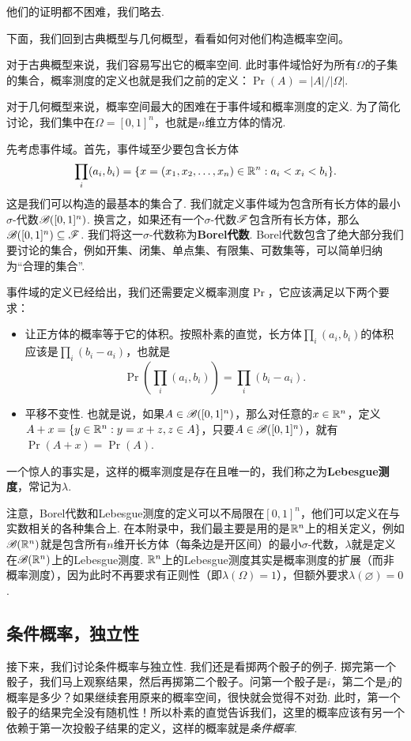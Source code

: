 他们的证明都不困难，我们略去. 

下面，我们回到古典概型与几何概型，看看如何对他们构造概率空间。 

对于古典概型来说，我们容易写出它的概率空间. 此时事件域恰好为所有$\Omega$的子集的集合，概率测度的定义也就是我们之前的定义：$\Pr(A)=|A|/|\Omega|$. 

对于几何概型来说，概率空间最大的困难在于事件域和概率测度的定义. 为了简化讨论，我们集中在$\Omega=[0,1]^n$，也就是$n$维立方体的情况. 

先考虑事件域。首先，事件域至少要包含长方体
\[\prod_i(a_i,b_i)=\{x=(x_1,x_2,\ldots,x_n)\in\mathbb{R}^n:a_i<x_i<b_i\}.\]
这是我们可以构造的最基本的集合了. 我们就定义事件域为包含所有长方体的最小$\sigma$-代数$\mathscr{B}([0,1]^n)$. 换言之，如果还有一个$\sigma$-代数$\mathscr{F}$包含所有长方体，那么$\mathscr{B}([0,1]^n)\subseteq\mathscr{F}$. 我们将这一$\sigma$-代数称为\textbf{Borel代数}. Borel代数包含了绝大部分我们要讨论的集合，例如开集、闭集、单点集、有限集、可数集等，可以简单归纳为“合理的集合”. 

事件域的定义已经给出，我们还需要定义概率测度$\Pr$，它应该满足以下两个要求：
\begin{itemize}
    \item 让正方体的概率等于它的体积。按照朴素的直觉，长方体$\prod_i(a_i,b_i)$的体积应该是$\prod_i(b_i-a_i)$，也就是
    \[
        \Pr\left(\prod_i(a_i,b_i)\right) = \prod_i(b_i-a_i).
    \]
    \item 平移不变性. 也就是说，如果$A\in\mathscr{B}([0,1]^n)$，那么对任意的$x\in\mathbb{R}^n$，定义$A+x=\{y\in\mathbb{R}^n:y=x+z,z\in A\}$，只要$A\in\mathscr{B}([0,1]^n)$，就有$\Pr(A+x)=\Pr(A)$.
\end{itemize}
一个惊人的事实是，这样的概率测度是存在且唯一的，我们称之为\textbf{Lebesgue测度}，常记为$\lambda$.

注意，Borel代数和Lebesgue测度的定义可以不局限在$[0,1]^n$，他们可以定义在与实数相关的各种集合上. 在本附录中，我们最主要是用的是$\mathbb{R}^n$上的相关定义，例如$\mathscr{B}(\mathbb{R}^n)$就是包含所有$n$维开长方体（每条边是开区间）的最小$\sigma$-代数，$\lambda$就是定义在$\mathscr{B}(\mathbb{R}^n)$上的Lebesgue测度. $\mathbb{R}^n$上的Lebesgue测度其实是概率测度的扩展（而非概率测度），因为此时不再要求有正则性（即$\lambda(\Omega)=1$），但额外要求$\lambda(\varnothing)=0$.

\subsection{条件概率，独立性}
接下来，我们讨论条件概率与独立性. 我们还是看掷两个骰子的例子. 掷完第一个骰子，我们马上观察结果，然后再掷第二个骰子。问第一个骰子是$i$，第二个是$j$的概率是多少？如果继续套用原来的概率空间，很快就会觉得不对劲. 此时，第一个骰子的结果完全没有随机性！所以朴素的直觉告诉我们，这里的概率应该有另一个依赖于第一次投骰子结果的定义，这样的概率就是\emph{条件概率}. 

